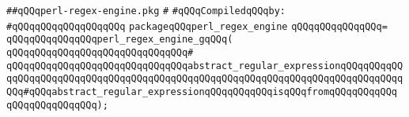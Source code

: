 \label{src/lib/regex/backend/perl-regex-engine.pkg}
\verb|##qQQqperl-regex-engine.pkg|\newline
\verb|#|\newline
\newline
\verb|#qQQqCompiledqQQqby:|\newline
\verb|#qQQqqQQqqQQqqQQqqQQq|\newline
\newline
\newline
\verb|packageqQQqperl_regex_engine|\newline
\verb|qQQqqQQqqQQqqQQq=|\newline
\verb|qQQqqQQqqQQqqQQqperl_regex_engine_gqQQq(|\newline
\verb|qQQqqQQqqQQqqQQqqQQqqQQqqQQqqQQq#|\newline
\verb|qQQqqQQqqQQqqQQqqQQqqQQqqQQqqQQqabstract_regular_expressionqQQqqQQqqQQqqQQqqQQqqQQqqQQqqQQqqQQqqQQqqQQqqQQqqQQqqQQqqQQqqQQqqQQqqQQqqQQqqQQqqQQq#qQQqabstract_regular_expressionqQQqqQQqqQQqisqQQqfromqQQqqQQqqQQq|\newline
\verb|qQQqqQQqqQQqqQQq);|\newline
\newline
\newline

